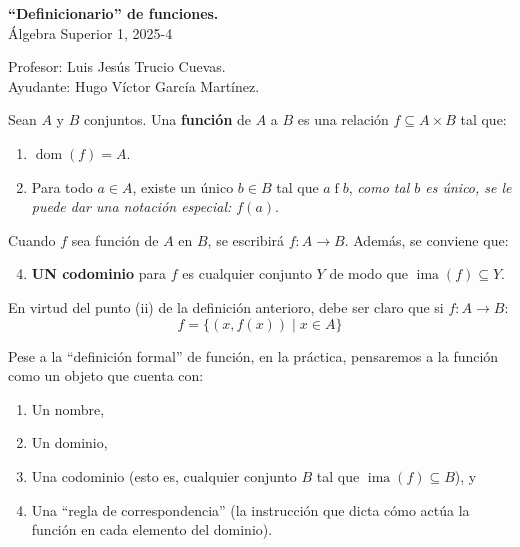 \documentclass[letterpaper,DIV=14,headsepline,12pt]{scrartcl}
\providecommand\tq{\;|\;}
\DeclareMathOperator{\ima}{ima}
\DeclareMathOperator{\dom}{dom}
\begin{document}
    \begin{center}
        {\fontsize{30}{60}\rmfamily \textbf{``Definicionario'' de funciones.}} \\ \vspace{.2cm}
        Álgebra Superior 1, 2025-4
    \end{center}
    \begin{flushright}
        \footnotesize \hfill Profesor: Luis Jesús Trucio Cuevas.\\
        \hfill Ayudante: Hugo Víctor García Martínez.
    \end{flushright}

    \begin{definicion}
        Sean $A$ y $B$ conjuntos. Una \textbf{función} de $A$ a $B$ es una relación $f \subseteq A \times B$ tal que:
        \begin{enumerate}
            \item $\dom(f)=A$.
            \item Para todo $a \in A$, existe un único $b \in B$ tal que $a \mathrel{f} b$, \textit{como tal $b$ es único, se le puede dar una notación especial: $f(a)$}.
        \end{enumerate}
        Cuando $f$ sea función de $A$ en $B$, se escribirá $f: A \to B$. Además, se conviene que:
        \begin{enumerate} \setcounter{enumi}{3}
            \item \textbf{UN codominio} para $f$ es cualquier conjunto $Y$ de modo que $\ima(f) \subseteq Y$.
        \end{enumerate}
    \end{definicion}

    En virtud del punto (ii) de la definición anterioro, debe ser claro que si $f:A \to B$:
    \[ f=\{(x,f(x)) \tq x \in A \} \]

    Pese a la ``definición formal'' de función, en la práctica, pensaremos a la función como un objeto que cuenta con:
    \begin{enumerate}
        \item Un nombre,
        \item Un dominio,
        \item Una codominio (esto es, cualquier conjunto $B$ tal que $\ima(f)\subseteq B$), y
        \item Una ``regla de correspondencia'' (la instrucción que dicta cómo actúa la función en cada elemento del dominio).
    \end{enumerate}
\end{document}
